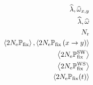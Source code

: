 \documentclass{article}
\begin{document}
\begin{align}
	\widehat{\lambda}, \widehat{\omega}_{\aaSource, \aaTarget} \\
	\widehat{\lambda}, \widehat{\omega} \\
	\Ner \\
	\avgpfix, \avgpfixAA  \\
	\avgpfixGCtoAT \\
	\avgpfixATtoGC \\
	\avgpfixtime
\end{align}
\end{document}
